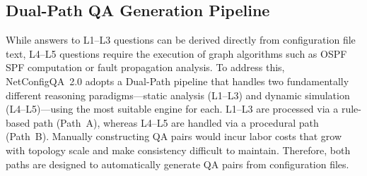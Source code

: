 

\subsection{Dual-Path QA Generation Pipeline}

While answers to L1--L3 questions can be derived directly from configuration file text, L4--L5 questions require the execution of graph algorithms such as OSPF SPF computation or fault propagation analysis.
To address this, NetConfigQA~2.0 adopts a Dual-Path pipeline that handles two fundamentally different reasoning paradigms—static analysis (L1--L3) and dynamic simulation (L4--L5)—using the most suitable engine for each.
L1--L3 are processed via a rule-based path (Path~A), whereas L4--L5 are handled via a procedural path (Path~B).
Manually constructing QA pairs would incur labor costs that grow with topology scale and make consistency difficult to maintain. Therefore, both paths are designed to automatically generate QA pairs from configuration files.



